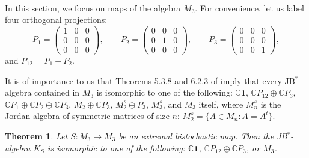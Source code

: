 \documentclass[12pt]{article}
\theoremstyle{plain}
\newtheorem{theorem}{Theorem}
\theoremstyle{definition}
\theoremstyle{remark}
\numberwithin{equation}{section}
\begin{document}
\paragraph{}
In this section, we focus on maps of the algebra $M_{3}$.
For convenience, let us label four orthogonal projections:
\begin{equation}
\label{def:OrthogonalProjections}
    P_{1} = \begin{pmatrix}
        1 & 0 & 0 \\
        0 & 0 & 0 \\
        0 & 0 & 0
    \end{pmatrix} , \quad \quad
    P_{2} = \begin{pmatrix}
        0 & 0 & 0 \\
        0 & 1 & 0 \\
        0 & 0 & 0
    \end{pmatrix} , \quad \quad
    P_{3} = \begin{pmatrix}
        0 & 0 & 0 \\
        0 & 0 & 0 \\
        0 & 0 & 1
    \end{pmatrix},
\end{equation}
and $P_{12} = P_{1} + P_{2}$.

It is of importance to us that
Theorems 5.3.8 and 6.2.3 of \cite{hanche1984jordan}
imply that every JB$^{*}$-algebra contained in $M_{3}$ is
isomorphic to one of the following:
$\mathbb{C}\mathbf{1}$, 
$\mathbb{C} P_{12} \oplus \mathbb{C} P_{3}$,
$\mathbb{C} P_{1} \oplus \mathbb{C} P_{2} \oplus \mathbb{C} P_{3}$,
$M_{2} \oplus \mathbb{C} P_{3}$,
$M_{2}^{s} \oplus P_{3}$, 
$M_{3}^{s}$,
and
$M_{3}$ itself,
where $M_{n}^{s}$ is the Jordan algebra of symmetric matrices of 
size $n$: $M_{2}^{s} = \{ A \in M_{n}: A = A^{t} \}$.  

\begin{theorem}
\label{thm:ExposedMaps}
Let $S\!: M_{3} \rightarrow M_{3}$ be an extremal bistochastic map.
Then the JB$^{*}$-algebra $K_{S}$ is isomorphic to one of the following:
$\mathbb{C}\mathbf{1}$, $\mathbb{C} P_{12} \oplus \mathbb{C} P_{3}$,
or
$M_{3}$.
\end{theorem}
\end{document}
